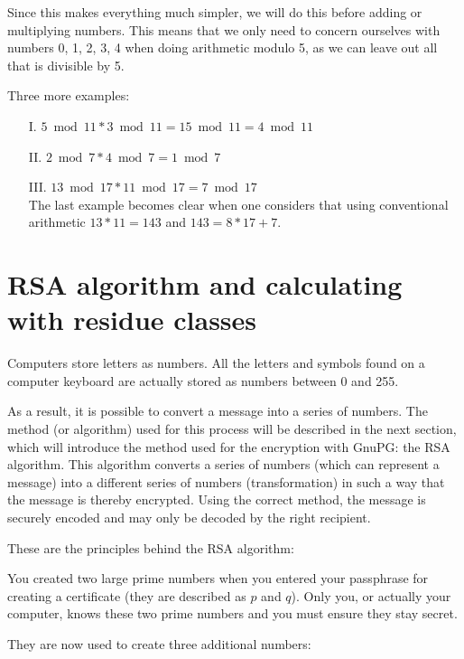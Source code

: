 \documentclass[a4paper,11pt,oneside,openright,titlepage]{scrbook}
\begin{document}
Since this makes everything much simpler, we will do this before
adding or multiplying numbers. This means that we only need to concern
ourselves with numbers 0, 1, 2, 3, 4 when doing arithmetic modulo 5,
as we can leave out all that is divisible by 5.

Three more examples:

\begin{enumerate}
    \item[I.] $ 5 \bmod 11 * 3 \bmod 11 = 15 \bmod 11 = 4 \bmod 11 $
    \item[II.] $ 2 \bmod 7 * 4 \bmod 7 = 1 \bmod 7 $
    \item[III.] $ 13 \bmod 17 * 11 \bmod 17 = 7 \bmod 17 $\\
    The last example becomes clear when one considers that using conventional arithmetic $ 13 * 11 = 143 $ and $ 143 = 8 * 17 + 7 $.
\end{enumerate}


\clearpage
\section{RSA algorithm and calculating with residue classes}

Computers store letters as numbers. All the letters and symbols found
on a computer keyboard are actually stored as numbers between 0 and
255.

As a result, it is possible to convert a message into a series of
numbers. The method (or algorithm) used for this process will be
described in the next section, which will introduce the method used
for the encryption with GnuPG: the RSA algorithm. This algorithm
converts a series of numbers (which can represent a message) into a
different series of numbers (transformation) in such a way that the
message is thereby encrypted. Using the correct method, the message is
securely encoded and may only be decoded by the right recipient.

These are the principles behind the RSA algorithm:

You created two large prime numbers when you
entered your passphrase for creating a certificate (they are described
as $p$ and $q$). Only you, or actually your computer, knows these two
prime numbers and you must ensure they stay secret.

They are now used to create three additional numbers:
\end{document}
